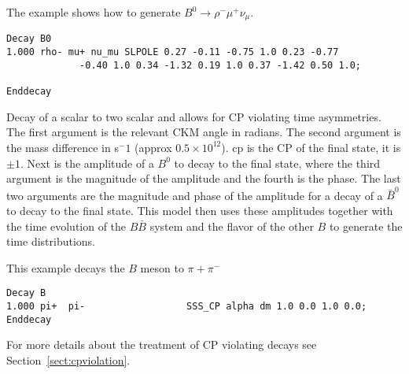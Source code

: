 \Example
The example shows how to generate $B^0\rightarrow \rho^- \mu^+ \nu_{\mu}$.
\begin{verbatim}
Decay B0
1.000 rho- mu+ nu_mu SLPOLE 0.27 -0.11 -0.75 1.0 0.23 -0.77 
             -0.40 1.0 0.34 -1.32 0.19 1.0 0.37 -1.42 0.50 1.0;

Enddecay
\end{verbatim}

\Notes






\label{ssscp}



\Expl
Decay of a scalar to two scalar and allows for CP violating 
time asymmetries. The first argument is the relevant CKM
angle in radians. The second argument is the mass difference
in s$^-1$ (approx $0.5\times 10^{12}$). 
cp is the CP of the final state, it is $\pm 1$. 
Next is the amplitude 
of a $B^0$ to decay to the final state, where the third argument is the 
magnitude of the amplitude and the fourth is the phase. The
last two arguments are the magnitude and phase of the
amplitude for a decay of a $\bar B^0$ to decay to the 
final state. This model then uses these amplitudes 
together with the time evolution of the
$B\bar B$ system and the flavor of the other
$B$ to generate the time distributions.

\Example
This example decays the $B$ meson to $\pi+\pi^-$
\begin{verbatim}
Decay B
1.000 pi+  pi-                  SSS_CP alpha dm 1.0 0.0 1.0 0.0;
Enddecay
\end{verbatim}

\Notes
For more details about the treatment of CP violating decays 
see Section~\ref{sect:cpviolation}.



\label{ssscppng}



